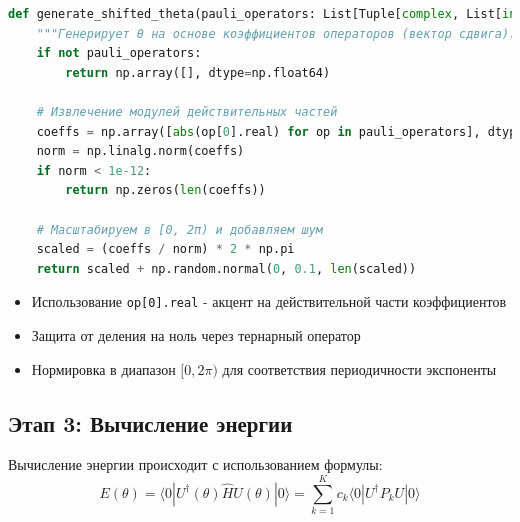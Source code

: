 \documentclass[a4paper]{report}
\begin{document}
\begin{lstlisting}[language=Python]
def generate_shifted_theta(pauli_operators: List[Tuple[complex, List[int]]]) -> np.ndarray:
    """Генерирует θ на основе коэффициентов операторов (вектор сдвига)."""
    if not pauli_operators:
        return np.array([], dtype=np.float64)

    # Извлечение модулей действительных частей
    coeffs = np.array([abs(op[0].real) for op in pauli_operators], dtype=np.float64)
    norm = np.linalg.norm(coeffs)
    if norm < 1e-12:
        return np.zeros(len(coeffs))

    # Масштабируем в [0, 2π) и добавляем шум
    scaled = (coeffs / norm) * 2 * np.pi
    return scaled + np.random.normal(0, 0.1, len(scaled))
\end{lstlisting}
\begin{itemize}
\item Использование \texttt{op[0].real} - акцент на действительной части коэффициентов
\item Защита от деления на ноль через тернарный оператор
\item Нормировка в диапазон $[0, 2\pi)$ для соответствия периодичности экспоненты
\end{itemize}

\subsection{Этап 3: Вычисление энергии}
Вычисление энергии происходит с использованием формулы:
\begin{equation}
E(\theta) = \langle 0|U^\dagger(\theta)\hat{H}U(\theta)|0\rangle = \sum_{k=1}^K c_k \langle 0|U^\dagger P_k U|0\rangle
\end{equation}
\end{document}
